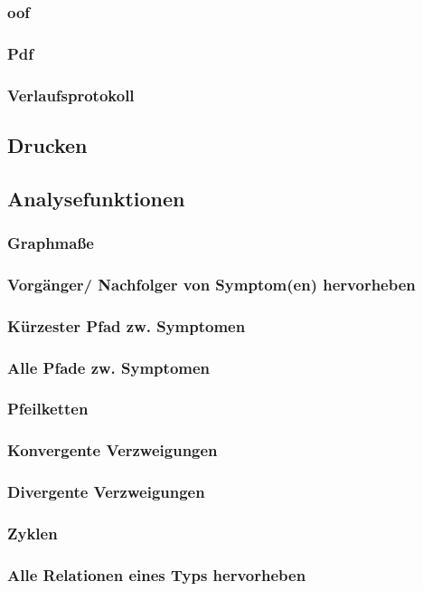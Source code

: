 \documentclass[enabledeprecatedfontcommands,fontsize=11pt,paper=a4,twoside]{scrartcl}
\newcounter{one}
\begin{document}
		\subsubsection{oof}
		\subsubsection{Pdf}
		\subsubsection{Verlaufsprotokoll}
	\subsection{Drucken} \label{print}
	\subsection{Analysefunktionen}
		\subsubsection{Graphmaße} \label{analyse}
		\subsubsection{Vorgänger/ Nachfolger von Symptom(en) hervorheben}
		\subsubsection{Kürzester Pfad zw. Symptomen}
		\subsubsection{Alle Pfade zw. Symptomen}
		\subsubsection{Pfeilketten}
		\subsubsection{Konvergente Verzweigungen}
		\subsubsection{Divergente Verzweigungen}
		\subsubsection{Zyklen}
		\subsubsection{Alle Relationen eines Typs hervorheben}		
\end{document}
